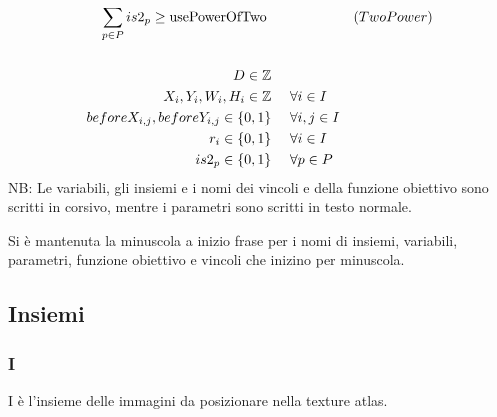 \begin{align*}
\sum_{p \in P} is2_p \geq \text{usePowerOfTwo}       \ \ \ \ \   & & \eqname{(TwoPower)} \\
\\
%
%
%
%
%
D \in \IntegerSet \ \ \ \ & & \\
X_i, Y_i, W_i, H_i \in \IntegerSet      \ \ \ \ & \fori{} \\
beforeX_{i,j}, beforeY_{i,j} \in \BinSet    \ \ \ \ & \forall{i,j \in I} \\
%
r_i \in \BinSet \ \ \ \ & \fori{} \\
%
is2_p \in \BinSet \ \ \ \ & \forall{p \in P} \\
%
%
%
 \end{align*}
NB: Le variabili, gli insiemi e i nomi dei vincoli e della funzione obiettivo sono scritti in corsivo, mentre i parametri sono scritti in testo normale.




\iffalse
Changelog del modello

Il modello è passato per più fasi incrementali:
* La prima versione risolve il problema base
* Quindi è stato aggiunto il supporto per il bleeding
* La terza versione ha aggiunto la possibilità di ruotare le immagini
* La quarta e ultima versione permette di fissare la dimensione della texture atlas a potenze di 2
\fi












\newpage


\noindent Si è mantenuta la minuscola a inizio frase per i nomi di insiemi, variabili, parametri, funzione obiettivo e vincoli che inizino per minuscola.

\subsection{Insiemi}
\subsubsection{I}
I è l'insieme delle immagini da posizionare nella texture atlas.

